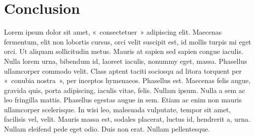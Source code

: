 \chapter*{Conclusion}


Lorem ipsum dolor sit amet, «~consectetuer~» adipiscing elit. Maecenas fermentum, elit non lobortis cursus, orci velit suscipit est, id mollis turpis mi eget orci. Ut aliquam sollicitudin metus. Mauris at sapien sed sapien congue iaculis. Nulla lorem urna, bibendum id, laoreet iaculis, nonummy eget, massa. Phasellus ullamcorper commodo velit. Class aptent taciti sociosqu ad litora torquent per «~conubia nostra~», per inceptos hymenaeos. Phasellus est. Maecenas felis augue, gravida quis, porta adipiscing, iaculis vitae, felis. Nullam ipsum. Nulla a sem ac leo fringilla mattis. Phasellus egestas augue in sem. Etiam ac enim non mauris ullamcorper scelerisque. In wisi leo, malesuada vulputate, tempor sit amet, facilisis vel, velit. Mauris massa est, sodales placerat, luctus id, hendrerit a, urna. Nullam eleifend pede eget odio. Duis non erat. Nullam pellentesque.
